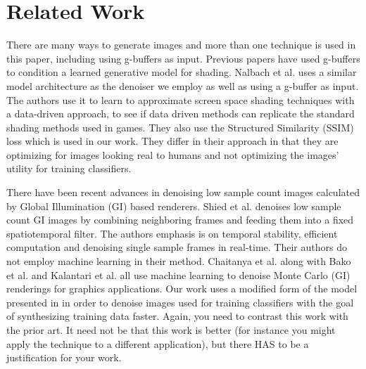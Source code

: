\documentclass[10pt,twocolumn,letterpaper]{article}
\newcommand{\tompson}[1]{{\color{green} JT: #1}}
\begin{document}
\section{Related Work}

There are many ways to generate images and more than one technique is used in this paper, including using g-buffers as input. Previous papers have used g-buffers to condition a learned generative model for shading. Nalbach et al. \cite{DBLP:journals/corr/NalbachAMSR16} uses a similar model architecture as the denoiser we employ as well as using a g-buffer as input.  The authors use it to learn to approximate screen space shading techniques with a data-driven approach, to see if data driven methods can replicate the standard shading methods used in games.  They also use the Structured Similarity (SSIM) loss which is used in our work. They differ in their approach in that they are optimizing for images looking real to humans and not optimizing the images' utility for training classifiers.


There have been recent advances in denoising low sample count images calculated by Global Illumination (GI) based renderers.
Shied et al. \cite{Schied:2017:SVF:3105762.3105770} denoises low sample count GI images by combining neighboring frames and feeding them into a fixed spatiotemporal filter.  The authors emphasis is on temporal stability, efficient computation and denoising single sample frames in real-time. Their authors do not employ machine learning in their method. 
Chaitanya et al. \cite{Chaitanya:2017:IRM:3072959.3073601} along with 
Bako et al. \cite{Bako17} and 
Kalantari et al. \cite{Kalantari:2015:MLA:2809654.2766977} all use machine learning to denoise Monte Carlo (GI) renderings for graphics applications.  Our work uses a modified form of the model presented in \cite{Chaitanya:2017:IRM:3072959.3073601} in order to denoise images used for training classifiers with the goal of synthesizing training data faster. Again, you need to contrast this work with the prior art. It need not be that this work is better (for instance you might apply the technique to a different application), but there HAS to be a justification for your work.
\end{document}
